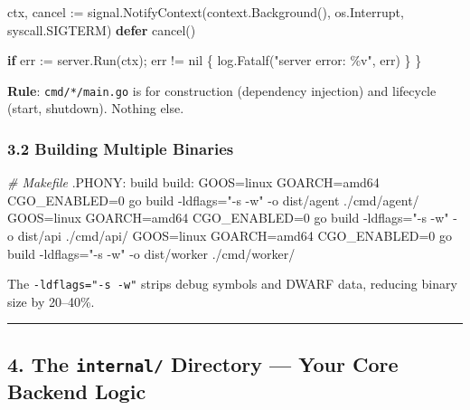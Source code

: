 \documentclass[
]{article}
\newenvironment{Shaded}{}{}
\newcommand{\CommentTok}[1]{\textcolor[rgb]{0.38,0.63,0.69}{\textit{#1}}}
\newcommand{\ControlFlowTok}[1]{\textcolor[rgb]{0.00,0.44,0.13}{\textbf{#1}}}
\newcommand{\DataTypeTok}[1]{\textcolor[rgb]{0.56,0.13,0.00}{#1}}
\newcommand{\DecValTok}[1]{\textcolor[rgb]{0.25,0.63,0.44}{#1}}
\newcommand{\NormalTok}[1]{#1}
\newcommand{\OperatorTok}[1]{\textcolor[rgb]{0.40,0.40,0.40}{#1}}
\newcommand{\OtherTok}[1]{\textcolor[rgb]{0.00,0.44,0.13}{#1}}
\newcommand{\StringTok}[1]{\textcolor[rgb]{0.25,0.44,0.63}{#1}}
\begin{document}
\begin{Shaded}
\begin{Highlighting}[]
\NormalTok{    ctx}\OperatorTok{,}\NormalTok{ cancel }\OperatorTok{:=}\NormalTok{ signal}\OperatorTok{.}\NormalTok{NotifyContext}\OperatorTok{(}\NormalTok{context}\OperatorTok{.}\NormalTok{Background}\OperatorTok{(),}\NormalTok{ os}\OperatorTok{.}\NormalTok{Interrupt}\OperatorTok{,}\NormalTok{ syscall}\OperatorTok{.}\NormalTok{SIGTERM}\OperatorTok{)}
    \ControlFlowTok{defer}\NormalTok{ cancel}\OperatorTok{()}

    \ControlFlowTok{if}\NormalTok{ err }\OperatorTok{:=}\NormalTok{ server}\OperatorTok{.}\NormalTok{Run}\OperatorTok{(}\NormalTok{ctx}\OperatorTok{);}\NormalTok{ err }\OperatorTok{!=} \OtherTok{nil} \OperatorTok{\{}
\NormalTok{        log}\OperatorTok{.}\NormalTok{Fatalf}\OperatorTok{(}\StringTok{"server error: \%v"}\OperatorTok{,}\NormalTok{ err}\OperatorTok{)}
    \OperatorTok{\}}
\OperatorTok{\}}
\end{Highlighting}
\end{Shaded}

\textbf{Rule}: \texttt{cmd/*/main.go} is for construction (dependency
injection) and lifecycle (start, shutdown). Nothing else.

\hypertarget{building-multiple-binaries}{%
\subsubsection{3.2 Building Multiple
Binaries}\label{building-multiple-binaries}}

\begin{Shaded}
\begin{Highlighting}[]
\CommentTok{\# Makefile}
\OtherTok{.PHONY:}\DataTypeTok{ build}
\DecValTok{build:}
\NormalTok{    GOOS=linux GOARCH=amd64 CGO\_ENABLED=0 go build {-}ldflags=}\StringTok{"{-}s {-}w"}\NormalTok{ {-}o dist/agent ./cmd/agent/}
\NormalTok{    GOOS=linux GOARCH=amd64 CGO\_ENABLED=0 go build {-}ldflags=}\StringTok{"{-}s {-}w"}\NormalTok{ {-}o dist/api ./cmd/api/}
\NormalTok{    GOOS=linux GOARCH=amd64 CGO\_ENABLED=0 go build {-}ldflags=}\StringTok{"{-}s {-}w"}\NormalTok{ {-}o dist/worker ./cmd/worker/}
\end{Highlighting}
\end{Shaded}

The \texttt{-ldflags="-s\ -w"} strips debug symbols and DWARF data,
reducing binary size by 20--40\%.

\begin{center}\rule{0.5\linewidth}{0.5pt}\end{center}

\hypertarget{the-internal-directory-your-core-backend-logic}{%
\subsection{\texorpdfstring{4. The \texttt{internal/} Directory --- Your
Core Backend
Logic}{4. The internal/ Directory --- Your Core Backend Logic}}\label{the-internal-directory-your-core-backend-logic}}
\end{document}
